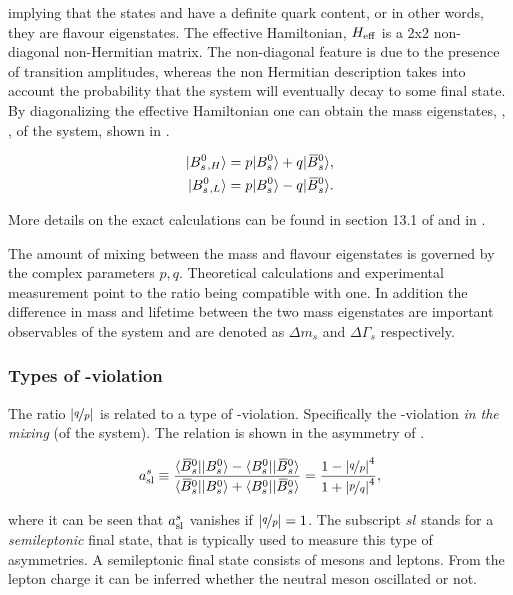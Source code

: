 \noindent implying that the states \Bs and \Bsb have a definite quark content, or in other words,
they are flavour eigenstates. The effective Hamiltonian, $H_{\rm eff}$ is a 2x2 non-diagonal non-Hermitian matrix.
The non-diagonal feature is due to the presence of \BBbarSyst transition amplitudes,
whereas the non Hermitian description takes into account the probability that the system will
eventually decay to some final state. By diagonalizing the effective Hamiltonian one can obtain
the mass eigenstates, , , of the system, shown in .

\begin{align}
  \centering
  \ket{\Bs{}_{,H}} &= p \ket{\Bs} + q \ket{\Bsb}, \nonumber \\
  \ket{\Bs{}_{,L}} &= p \ket{\Bs} - q \ket{\Bsb}.
  \label{bs_mass_eigen}
\end{align}

More details on the exact calculations can be found in section 13.1 of \cite{PDG} and in \cite{jeroenThesis,DeBruyn-thesis}.

The amount of mixing between the mass and flavour eigenstates is governed by the complex parameters $p,q$.
Theoretical calculations \cite{Lenz:2011ti} and experimental measurement \cite{asl-paper} point to the ratio
\qoverp being compatible with one. In addition the difference in mass and lifetime between the two mass
eigenstates are important observables of the \BBbarSyst system and are denoted as $\Delta m_s$ and $\Delta\Gamma_s$ respectively.

\subsubsection{Types of \CP-violation}
The ratio $|\nicefrac{q}{p}|$ is related to a type of \CP-violation. Specifically the \CP-violation {\it in the mixing} (of the \BBbarSyst system).
The relation is shown in the asymmetry of .

\begin{equation}
  \centering
  a_{\rm sl}^{s}  \equiv \frac{\bra{\Bsb}\ket{\Bs} - \bra{\Bs}\ket{\Bsb}} {\bra{\Bsb}\ket{\Bs} + \bra{\Bs}\ket{\Bsb}}
                       = \frac{1 - \left|\nicefrac{q}{p}\right|^4}{1 + \left|\nicefrac{p}{q}\right|^4},
  \label{acp_mixing}
\end{equation}

\noindent where it can be seen that $a_{\rm sl}^{s}$ vanishes if $|\nicefrac{q}{p}|= 1$. The subscript $sl$ stands for a {\it semileptonic}
final state, that is typically used to measure this type of asymmetries. A semileptonic final state
consists of mesons and leptons. From the lepton charge it can be inferred whether the neutral meson oscillated or not.

